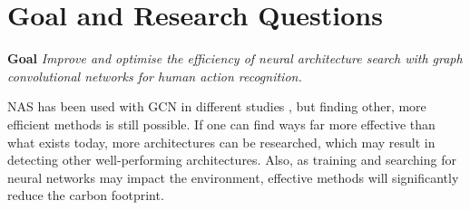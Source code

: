 \begin{comment}
\textbf{Research Question 2} \textit{How does the relationship between zero-cost proxies and validation accuracy evolve during the warm-up phase of \gls{GCN} training, and how early can we potentially halt the training process?}
\end{comment}
\begin{comment}
\textbf{Research Question 2} \textit{How does the correlation between zero-cost proxies and validation accuracy change during the warm-up phase, as \gls{GCN} architectures are trained for up to 10 epochs? }

This research question investigates the relationship between zero-cost proxies and validation accuracy during the initial training phase (referred to as the warm-up phase) of \gls{GCN} architectures. Specifically, it seeks to understand how the predictive power of zero-cost proxies evolves as architectures are trained for up to 10 epochs. 
\end{comment}

\begin{comment}
\textbf{Research question 3}\textit{ How will combining zero-cost proxies improve neural architecture search for \gls{GCN}?}

Studies on zero-cost proxies on different computer vision tasks using \gls{CNN} show that combining them may yield better performance than using them independently. Therefore, we will investigate how we can use an ensemble of zero-cost proxies in a neural architecture search for \gls{GCN}. 


\textbf{Research question X} \textit{How can we effectively combine zero-cost proxies using various techniques, such as supervised learning, feature engineering, and weighted averaging, to enhance the efficiency and accuracy of architecture search in Neural Architecture Search (\gls{NAS}) algorithms?}
\end{comment}
\section{Goal and Research Questions}\label{section:goalsandrq}

\textbf{Goal} \textit{Improve and optimise the efficiency of neural architecture search with graph convolutional networks for human action recognition.} 

\gls{NAS} has been used with \gls{GCN} in different studies \autocite{zhou2019auto, groos2022toward, peng2020learning}, but finding other, more efficient methods is still possible. If one can find ways far more effective than what exists today, more architectures can be researched, which may result in detecting other well-performing architectures. Also, as training and searching for neural networks may impact the environment, effective methods will significantly reduce the carbon footprint. 

